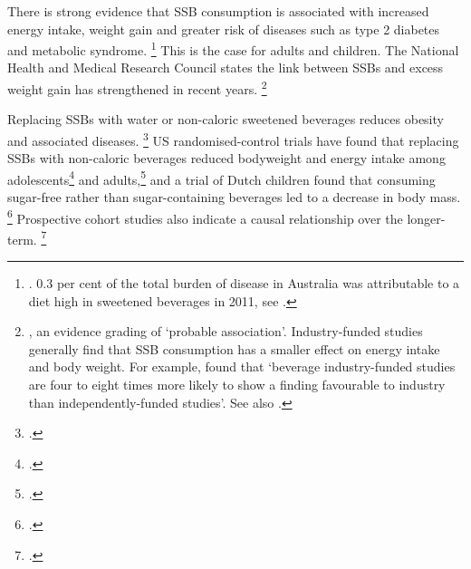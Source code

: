 \documentclass[embargoed]{grattan}
\begin{document}
There is strong evidence that SSB consumption is associated with increased energy intake, weight gain and greater risk of diseases such as type 2 diabetes and metabolic syndrome.%
\footnote{\textcites{Johnson2009Dietarysugarsintake}{Woodward-Lopez2010whatextenthave}{Ludwig2001Relationconsumptionsugar}{Berkey2004Sugaraddedbeveragesadolescent}{Gill2006weightevidencesuggests}{TeMorenga2013Dietarysugarsbody}{Tam2006Softdrinkconsumption}{Basu2013Relationshipsoftdrink}{Dhingra2007Softdrinkconsumption}{Vartanian2007Effectssoftdrink}{Imamura2015Consumptionsugarsweetened}{Pan2013Changeswaterbeverage}{Malik2006Intakesugarsweetened}{Malik2010Sugarsweetenedbeverages}{Malik2010riskmetaanalysis}{Organization2016Reportcommissionending}{Organisation2015Sugarsintakeadults}{Agriculture2010DietaryGuidelinesAmericans}. 0.3 per cent of the total burden of disease in Australia was attributable to a diet high in sweetened beverages in 2011, see \textcite{Health2016AustralianBurdenDisease}.} This is the case for adults and children.
The National Health and Medical Research Council states the link between SSBs and excess weight gain has strengthened in recent years.%
\footnote{\textcite[][67]{Health2013AustralianDietaryGuidelines}, an evidence grading of `probable association'.
Industry-funded studies generally find that SSB consumption has a smaller effect on energy intake and body weight.
For example, \textcite{Vartanian2007Effectssoftdrink} found that `beverage industry-funded studies are four to eight times more likely to show a finding favourable to industry than independently-funded studies'.
See also \textcites{Bes-Rastrollo2013Financialconflictsinterest}{Lesser2007Relationshipfundingsource}.}

Replacing SSBs with water or non-caloric sweetened beverages reduces obesity and associated diseases.%
\footcite{Malik2006Intakesugarsweetened} US randomised-control trials have found that replacing SSBs with non-caloric beverages reduced bodyweight and energy intake among adolescents\footcite{Ebbeling2002Childhoodobesitypublic} and adults,\footcite{Chen2009Reductionconsumptionsugar} and a trial of Dutch children found that consuming sugar-free rather than sugar-containing beverages led to a decrease in body mass.%
\footcites{Ruyter2012trialsugarfree}{Malik2006Intakesugarsweetened} Prospective cohort studies also indicate a causal relationship over the longer-term.%
\footcites{Hu2013Resolvedthereis}{Malik2006Intakesugarsweetened}{TeMorenga2013Dietarysugarsbody}
\end{document}
